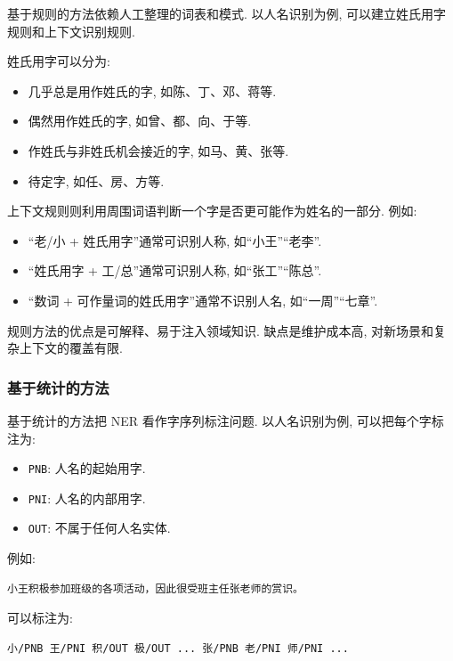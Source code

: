 基于规则的方法依赖人工整理的词表和模式.
以人名识别为例, 可以建立姓氏用字规则和上下文识别规则.

姓氏用字可以分为:

\begin{itemize}
\item 几乎总是用作姓氏的字, 如陈、丁、邓、蒋等.
\item 偶然用作姓氏的字, 如曾、都、向、于等.
\item 作姓氏与非姓氏机会接近的字, 如马、黄、张等.
\item 待定字, 如任、房、方等.
\end{itemize}

上下文规则则利用周围词语判断一个字是否更可能作为姓名的一部分.
例如:

\begin{itemize}
\item “老/小 + 姓氏用字”通常可识别人称, 如“小王”“老李”.
\item “姓氏用字 + 工/总”通常可识别人称, 如“张工”“陈总”.
\item “数词 + 可作量词的姓氏用字”通常不识别人名, 如“一周”“七章”.
\end{itemize}

规则方法的优点是可解释、易于注入领域知识.
缺点是维护成本高, 对新场景和复杂上下文的覆盖有限.

\subsubsection{基于统计的方法}


基于统计的方法把 NER 看作字序列标注问题.
以人名识别为例, 可以把每个字标注为:

\begin{itemize}
\item \texttt{PNB}: 人名的起始用字.
\item \texttt{PNI}: 人名的内部用字.
\item \texttt{OUT}: 不属于任何人名实体.
\end{itemize}

例如:

\begin{Verbatim}[breaklines=true,breakanywhere=true,fontsize=\small]
小王积极参加班级的各项活动，因此很受班主任张老师的赏识。
\end{Verbatim}

可以标注为:

\begin{Verbatim}[breaklines=true,breakanywhere=true,fontsize=\small]
小/PNB 王/PNI 积/OUT 极/OUT ... 张/PNB 老/PNI 师/PNI ...
\end{Verbatim}

